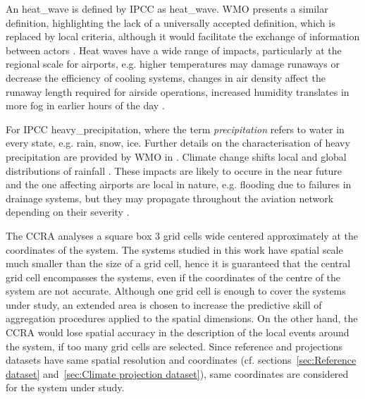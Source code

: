An \gls{heat_wave} is defined by \gls{IPCC} as \glsdesc{heat_wave}. \Gls{WMO} presents a similar definition, highlighting the lack of a universally accepted definition, which is replaced by local criteria, although it would facilitate the exchange of information between actors \cite[5]{2023WorldMeteorologicalOrganizationWMOGuidelinesOn}. Heat waves have a wide range of impacts, particularly at the regional scale for airports, e.g. higher temperatures may damage runaways or decrease the efficiency of cooling systems, changes in air density affect the runaway length required for airside operations, increased humidity translates in more fog in earlier hours of the day \cite[23-28]{2018ICAOClimateAdaptation}.

For \gls{IPCC} \glsdesc{heavy_precipitation}, where the term \emph{precipitation} refers to water in every state, e.g. rain, snow, ice. Further details on the characterisation of heavy precipitation are provided by \gls{WMO} in \cite[6-7]{2023WorldMeteorologicalOrganizationWMOGuidelinesOn}. Climate change shifts local and global distributions of rainfall \cite[1605]{2021SeneviratneWeatherAnd}. These impacts are likely to occure in the near future and the one affecting airports are local in nature, e.g. flooding due to failures in drainage systems, but they may propagate throughout the aviation network depending on their severity \cite[28-34]{2018ICAOClimateAdaptation}.

The \gls{CCRA} analyses a square box 3 grid cells wide centered approximately at the coordinates of the system. The systems studied in this work have spatial scale much smaller than the size of a grid cell, hence it is guaranteed that the central grid cell encompasses the systems, even if the coordinates of the centre of the system are not accurate.
Although one grid cell is enough to cover the systems under study, an extended area is chosen to increase the predictive skill of aggregation procedures applied to the spatial dimensions. On the other hand, the \gls{CCRA} would lose spatial accuracy in the description of the local events around the system, if too many grid cells are selected.
Since reference and projections datasets have same spatial resolution and coordinates (cf. sections~\ref{sec:Reference dataset} and~\ref{sec:Climate projection dataset}), same coordinates are considered for the system under study.

